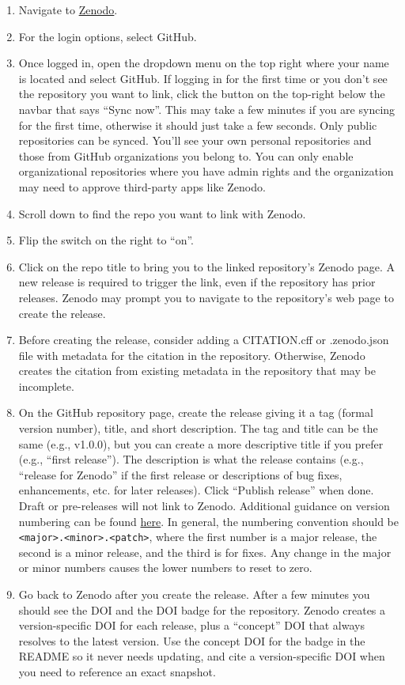 \documentclass[
]{book}
\providecommand{\tightlist}{%
  \setlength{\itemsep}{0pt}\setlength{\parskip}{0pt}}
\begin{document}
\begin{enumerate}
\def\labelenumi{\arabic{enumi}.}
\tightlist
\item
  Navigate to \href{https://zenodo.org}{Zenodo}.
\item
  For the login options, select GitHub.
\item
  Once logged in, open the dropdown menu on the top right where your name is located and select GitHub. If logging in for the first time or you don't see the repository you want to link, click the button on the top-right below the navbar that says ``Sync now''. This may take a few minutes if you are syncing for the first time, otherwise it should just take a few seconds. Only public repositories can be synced. You'll see your own personal repositories and those from GitHub organizations you belong to. You can only enable organizational repositories where you have admin rights and the organization may need to approve third-party apps like Zenodo.
\item
  Scroll down to find the repo you want to link with Zenodo.
\item
  Flip the switch on the right to ``on''.
\item
  Click on the repo title to bring you to the linked repository's Zenodo page. A new release is required to trigger the link, even if the repository has prior releases. Zenodo may prompt you to navigate to the repository's web page to create the release.\\
\item
  Before creating the release, consider adding a CITATION.cff or .zenodo.json file with metadata for the citation in the repository. Otherwise, Zenodo creates the citation from existing metadata in the repository that may be incomplete.
\item
  On the GitHub repository page, create the release giving it a tag (formal version number), title, and short description. The tag and title can be the same (e.g., v1.0.0), but you can create a more descriptive title if you prefer (e.g., ``first release''). The description is what the release contains (e.g., ``release for Zenodo'' if the first release or descriptions of bug fixes, enhancements, etc. for later releases). Click ``Publish release'' when done. Draft or pre-releases will not link to Zenodo. Additional guidance on version numbering can be found \href{https://r-pkgs.org/lifecycle.html}{here}. In general, the numbering convention should be \texttt{\textless{}major\textgreater{}.\textless{}minor\textgreater{}.\textless{}patch\textgreater{}}, where the first number is a major release, the second is a minor release, and the third is for fixes. Any change in the major or minor numbers causes the lower numbers to reset to zero.
\item
  Go back to Zenodo after you create the release. After a few minutes you should see the DOI and the DOI badge for the repository. Zenodo creates a version-specific DOI for each release, plus a ``concept'' DOI that always resolves to the latest version. Use the concept DOI for the badge in the README so it never needs updating, and cite a version-specific DOI when you need to reference an exact snapshot.
\end{enumerate}


\end{document}
